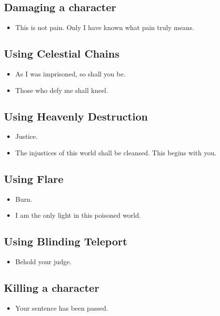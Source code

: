 \documentclass[10pt,a4paper,bg=print,twocolumn,openany,nodeprecatedcode]{dndarticle}
\begin{document}
\subsection*{Damaging a character}
\begin{itemize}
  \item This is not pain. Only I have known what pain truly means.
\end{itemize}

\subsection*{Using Celestial Chains}
\begin{itemize}
  \item As I was imprisoned, so shall you be.
  \item Those who defy me shall kneel.
\end{itemize}

\subsection*{Using Heavenly Destruction}
\begin{itemize}
  \item Justice.
  \item The injustices of this world shall be cleansed. This begins with you.
\end{itemize}

\subsection*{Using Flare}
\begin{itemize}
  \item Burn.
  \item I am the only light in this poisoned world.
\end{itemize}

\subsection*{Using Blinding Teleport}
\begin{itemize}
  \item Behold your judge.
\end{itemize}

\subsection*{Killing a character}
\begin{itemize}
  \item Your sentence has been passed.
\end{itemize}
\end{document}
